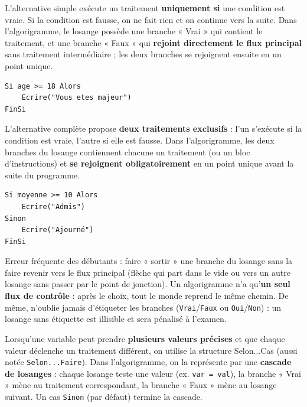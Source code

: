 \documentclass[11pt]{article}
\newcommand{\cle}[1]{{\popxbold\color{popdark}#1}}
\begin{document}
\begin{definition}
L'\cle{alternative simple} exécute un traitement \textbf{uniquement si} une condition est vraie. Si la condition est fausse, on ne fait rien et on continue vers la suite. Dans l'algorigramme, le losange possède une branche « Vrai » qui contient le traitement, et une branche « Faux » qui \textbf{rejoint directement le flux principal} sans traitement intermédiaire ; les deux branches se rejoignent ensuite en un point unique.
\end{definition}

\begin{lstlisting}
Si age >= 18 Alors
    Ecrire("Vous etes majeur")
FinSi
\end{lstlisting}

\begin{definition}
L'\cle{alternative complète} propose \textbf{deux traitements exclusifs} : l'un s'exécute si la condition est vraie, l'autre si elle est fausse. Dans l'algorigramme, les deux branches du losange contiennent chacune un traitement (ou un bloc d'instructions) et \textbf{se rejoignent obligatoirement} en un point unique avant la suite du programme.
\end{definition}

\begin{lstlisting}
Si moyenne >= 10 Alors
    Ecrire("Admis")
Sinon
    Ecrire("Ajourné")
FinSi
\end{lstlisting}

\begin{attention}
Erreur fréquente des débutants : faire « sortir » une branche du losange sans la faire revenir vers le flux principal (flèche qui part dans le vide ou vers un autre losange sans passer par le point de jonction). Un algorigramme n'a qu'\textbf{un seul flux de contrôle} : après le choix, tout le monde reprend le même chemin. De même, n'oublie jamais d'étiqueter les branches (\texttt{Vrai}/\texttt{Faux} ou \texttt{Oui}/\texttt{Non}) : un losange sans étiquette est illisible et sera pénalisé à l'examen.
\end{attention}

\begin{definition}
Lorsqu'une variable peut prendre \textbf{plusieurs valeurs précises} et que chaque valeur déclenche un traitement différent, on utilise la structure \cle{Selon...Cas} (aussi notée \texttt{Selon...Faire}). Dans l'algorigramme, on la représente par une \textbf{cascade de losanges} : chaque losange teste une valeur (ex. \texttt{var = val}), la branche « Vrai » mène au traitement correspondant, la branche « Faux » mène au losange suivant. Un cas \texttt{Sinon} (par défaut) termine la cascade.
\end{definition}
\end{document}
